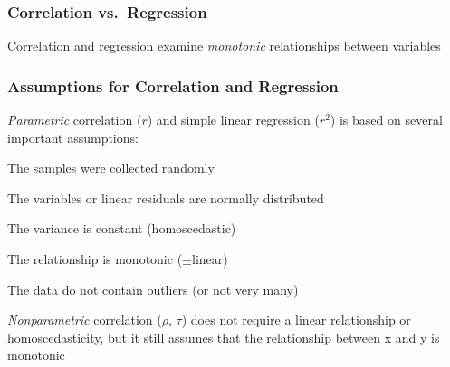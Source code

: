 \documentclass[10pt]{beamer}
\begin{document}
\begin{frame}
\frametitle{Correlation vs.~Regression}

{\small Correlation and regression examine {\em
    monotonic} relationships between variables}

\begin{center}
\end{center}
\end{frame}


\begin{frame}
\frametitle{Assumptions for Correlation and Regression}

\bi 
\item {\em Parametric} correlation ($r$) and simple linear regression
  ($r^2$) is based on several important assumptions: 

\bi
\item The samples were collected randomly 
\item The variables or linear residuals are normally distributed
\item The variance is constant (homoscedastic)
\item The relationship is monotonic ($\pm$linear)
\item The data do not contain outliers (or not very many)
\ei
\item {\em Nonparametric} correlation ($\rho$, $\tau$) does not
  require a linear relationship or homoscedasticity, but it still
  assumes that the relationship between x and y is monotonic
\ei
\end{frame}
\end{document}
